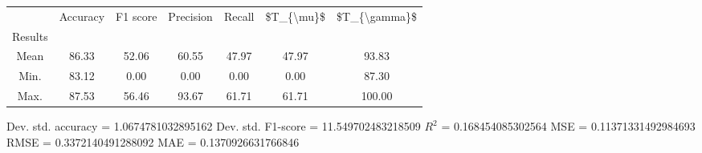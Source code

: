 \begin{tabular}{|c|c|c|c|c|c|c|}
\toprule
{} &  Accuracy &  F1 score &  Precision &  Recall &  \$T\_\{\textbackslash mu\}\$ &  \$T\_\{\textbackslash gamma\}\$ \\
Results &           &           &            &         &            &               \\
\hline
Mean    &     86.33 &     52.06 &      60.55 &   47.97 &      47.97 &         93.83 \\
Min.    &     83.12 &      0.00 &       0.00 &    0.00 &       0.00 &         87.30 \\
Max.    &     87.53 &     56.46 &      93.67 &   61.71 &      61.71 &        100.00 \\
\bottomrule
\end{tabular}

 Dev. std. accuracy = 1.0674781032895162
 Dev. std. F1-score = 11.549702483218509
 $R^2$ = 0.168454085302564
 MSE = 0.11371331492984693
 RMSE = 0.3372140491288092
 MAE = 0.1370926631766846